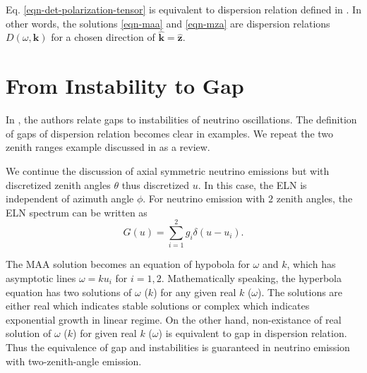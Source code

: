 \documentclass[%
preprint,
 amsmath,amssymb,
 aps,
 prd
]{revtex4-1}
\begin{document}
Eq. \eqref{eqn-det-polarization-tensor} is equivalent to dispersion relation defined in . In other words, the solutions \eqref{eqn-maa} and \eqref{eqn-mza} are dispersion relations $D(\omega,\mathbf k)$ for a chosen direction of $\hat{\mathbf k} = \hat{\mathbf z}$.




{\color{red}{\bf HAVE TO EXPLAIN THE IDEA OF GAP AND INSTABILITY HERE. Maybe Later?}}






\section{\label{sec-from-instability-to-gap}From Instability to Gap}

In , the authors relate gaps to instabilities of neutrino oscillations. The definition of gaps of dispersion relation becomes clear in examples. We repeat the two zenith ranges example discussed in  as a review.

We continue the discussion of axial symmetric neutrino emissions but with discretized zenith angles $\theta$ thus discretized $u$. In this case, the ELN is independent of azimuth angle $\phi$. For neutrino emission with $2$ zenith angles, the ELN spectrum can be written as
\begin{equation}
G(u)= \sum_{i=1}^2 g_i \delta(u - u_i).
\end{equation}

The MAA solution becomes an equation of hypobola for $\omega$ and $k$, which has asymptotic lines $\omega = k u_i$ for $i=1,2$. Mathematically speaking, the hyperbola equation has two solutions of $\omega$ ($k$) for any given real $k$ ($\omega$). The solutions are either real which indicates stable solutions or complex which indicates exponential growth in linear regime. On the other hand, non-existance of real solution of $\omega$ ($k$) for given real $k$ ($\omega$) is equivalent to gap in dispersion relation. Thus the equivalence of gap and instabilities is guaranteed in neutrino emission with two-zenith-angle emission.
\end{document}
